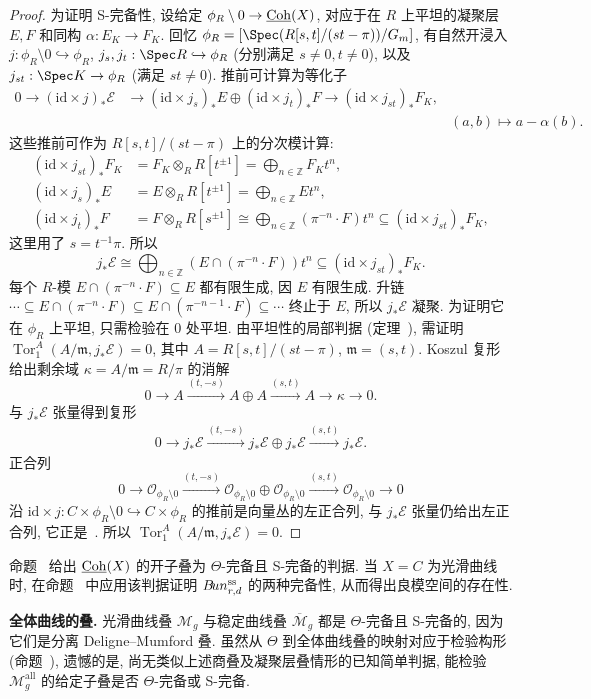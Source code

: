 \begin{proof}
为证明 S-完备性, 设给定 $\phi_R\setminus0\to\underline{\mathrm{Coh}}(X)$, 对应于在 $R$ 上平坦的凝聚层 $E,F$ 和同构 $\alpha:E_K\to F_K$. 回忆 $\phi_R=[\Spec(R[s,t]/(st-\pi))/\mathbb G_m]$, 有自然开浸入 $j:\phi_R\setminus0\hookrightarrow\phi_R$, $j_s,j_t:\Spec R\hookrightarrow\phi_R$ (分别满足 $s\ne0,t\ne0$), 以及 $j_{st}:\Spec K\to\phi_R$ (满足 $st\ne0$). 推前可计算为等化子
\begin{align*}
0\to(\mathrm{id}\times j)_*\mathcal E&\to(\mathrm{id}\times j_s)_*E\oplus(\mathrm{id}\times j_t)_*F\to(\mathrm{id}\times j_{st})_*F_K,\\
&&(a,b)\longmapsto a-\alpha(b).
\end{align*}
这些推前可作为 $R[s,t]/(st-\pi)$ 上的分次模计算:
\begin{align*}
(\mathrm{id}\times j_{st})_*F_K&=F_K\otimes_RR[t^{\pm1}]=\bigoplus_{n\in\mathbb Z}F_Kt^n,\\
(\mathrm{id}\times j_s)_*E&=E\otimes_RR[t^{\pm1}]=\bigoplus_{n\in\mathbb Z}Et^n,\\
(\mathrm{id}\times j_t)_*F&=F\otimes_RR[s^{\pm1}]\cong\bigoplus_{n\in\mathbb Z}(\pi^{-n}\cdot F)t^n\subseteq(\mathrm{id}\times j_{st})_*F_K,
\end{align*}
这里用了 $s=t^{-1}\pi$. 所以
\[j_*\mathcal E\cong\bigoplus_{n\in\mathbb Z}(E\cap(\pi^{-n}\cdot F))t^n\subseteq(\mathrm{id}\times j_{st})_*F_K.\]
每个 $R$-模 $E\cap(\pi^{-n}\cdot F)\subseteq E$ 都有限生成, 因 $E$ 有限生成. 升链 $\cdots\subseteq E\cap(\pi^{-n}\cdot F)\subseteq E\cap(\pi^{-n-1}\cdot F)\subseteq\cdots$ 终止于 $E$, 所以 $j_*\mathcal E$ 凝聚. 为证明它在 $\phi_R$ 上平坦, 只需检验在 $0$ 处平坦. 由平坦性的局部判据 (定理~), 需证明 $\operatorname{Tor}_1^A(A/\mathfrak m,j_*\mathcal E)=0$, 其中 $A=R[s,t]/(st-\pi)$, $\mathfrak m=(s,t)$. Koszul 复形给出剩余域 $\kappa=A/\mathfrak m=R/\pi$ 的消解
\[0\to A\xrightarrow{(t,-s)}A\oplus A\xrightarrow{(s,t)}A\to\kappa\to0.\]
与 $j_*\mathcal E$ 张量得到复形
\begin{align}\label{src:7.9.31}
0\to j_*\mathcal E\xrightarrow{(t,-s)}j_*\mathcal E\oplus j_*\mathcal E\xrightarrow{(s,t)}j_*\mathcal E.
\end{align}
正合列
\[0\to\mathcal O_{\phi_R\setminus0}\xrightarrow{(t,-s)}\mathcal O_{\phi_R\setminus0}\oplus\mathcal O_{\phi_R\setminus0}\xrightarrow{(s,t)}\mathcal O_{\phi_R\setminus0}\to0\]
沿 $\mathrm{id}\times j:C\times\phi_R\setminus0\hookrightarrow C\times\phi_R$ 的推前是向量丛的左正合列, 与 $j_*\mathcal E$ 张量仍给出左正合列, 它正是~. 所以 $\operatorname{Tor}_1^A(A/\mathfrak m,j_*\mathcal E)=0$.
\end{proof}
命题~ 给出 $\underline{\mathrm{Coh}}(X)$ 的开子叠为 $\Theta$-完备且 S-完备的判据. 当 $X=C$ 为光滑曲线时, 在命题~ 中应用该判据证明 $B\!un_{r,d}^{\mathrm{ss}}$ 的两种完备性, 从而得出良模空间的存在性.

\textbf{全体曲线的叠.} 光滑曲线叠 $\mathcal M_g$ 与稳定曲线叠 $\overline{\mathcal M}_g$ 都是 $\Theta$-完备且 S-完备的, 因为它们是分离 Deligne--Mumford 叠. 虽然从 $\Theta$ 到全体曲线叠的映射对应于检验构形 (命题~), 遗憾的是, 尚无类似上述商叠及凝聚层叠情形的已知简单判据, 能检验 $\mathcal M_g^{\mathrm{all}}$ 的给定子叠是否 $\Theta$-完备或 S-完备.
